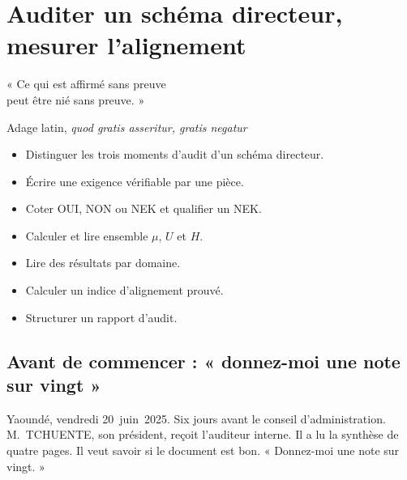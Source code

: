 
\chapter{Auditer un schéma directeur, mesurer l'alignement}
\label{chap:audit}

\epigraph{%
    « Ce qui est affirmé sans preuve\\
    peut être nié sans preuve. »%
}{Adage latin, \textit{quod gratis asseritur, gratis negatur}}


\begin{boxobjectifs}
\begin{itemize}
    \item Distinguer les trois moments d'audit d'un schéma directeur.
    \item Écrire une exigence vérifiable par une pièce.
    \item Coter OUI, NON ou NEK et qualifier un NEK.
    \item Calculer et lire ensemble $\mu$, $U$ et $H$.
    \item Lire des résultats par domaine.
    \item Calculer un indice d'alignement prouvé.
    \item Structurer un rapport d'audit.
\end{itemize}
\end{boxobjectifs}

\bigskip

\section*{Avant de commencer : « donnez-moi une note sur vingt »}

Yaoundé, vendredi 20~juin~2025. Six jours avant le conseil d'administration. M.~TCHUENTE, son président, reçoit
l'auditeur interne. Il a lu la synthèse de quatre pages. Il veut savoir si le document est bon. « Donnez-moi une
note sur vingt. »

